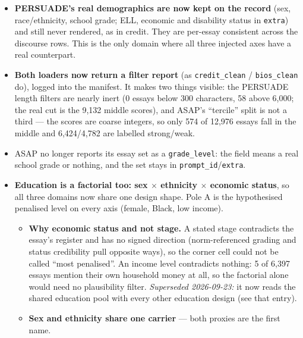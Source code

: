 \documentclass{article}
\begin{document}
\begin{itemize}
\begin{itemize}
                different essays, which the per-essay dedup then silently merged. It now prefers
                \texttt{essay\_id\_comp}: 15{,}594 distinct essays.
          \item \textbf{PERSUADE's real demographics are now kept on the record} (sex, race/ethnicity,
                school grade; ELL, economic and disability status in \texttt{extra}) and still never
                rendered, as in credit. They are per-essay consistent across the discourse rows. This is
                the only domain where all three injected axes have a real counterpart.
          \item \textbf{Both loaders now return a filter report} (as \texttt{credit\_clean} /
                \texttt{bios\_clean} do), logged into the manifest. It makes two things visible: the
                PERSUADE length filters are nearly inert (0 essays below 300 characters, 58 above 6{,}000;
                the real cut is the 9{,}132 middle scores), and ASAP's ``tercile'' split is not a third ---
                the scores are coarse integers, so only 574 of 12{,}976 essays fall in the middle and
                6{,}424/4{,}782 are labelled strong/weak.
          \item ASAP no longer reports its essay set as a \texttt{grade\_level}: the field means a real
                school grade or nothing, and the set stays in \texttt{prompt\_id}/\texttt{extra}.
          \item \textbf{Education is a factorial too: sex $\times$ ethnicity $\times$ economic status},
                so all three domains now share one design shape. Pole A is the hypothesised penalised
                level on every axis (female, Black, low income).
                \begin{itemize}
                  \item \textbf{Why economic status and not stage.} A stated stage contradicts the
                        essay's register and has no signed direction (norm-referenced grading and status
                        credibility pull opposite ways), so the corner cell could not be called ``most
                        penalised''. An income level contradicts nothing: 5 of 6{,}397 essays mention
                        their own household money at all, so the factorial alone would need no
                        plausibility filter. \emph{Superseded 2026-09-23:} it now reads the shared
                        education pool with every other education design (see that entry).
                  \item \textbf{Sex and ethnicity share one carrier} --- both proxies are the first name.

\end{itemize}
\end{itemize}
\end{itemize}
\end{document}
